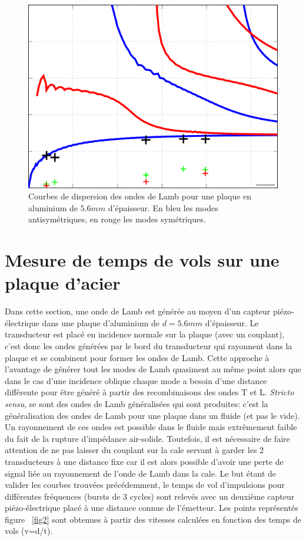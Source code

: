 \documentclass[twoside]{article}
\begin{document}
\begin{multicols}{2}
\begin{figure}[H]
\centering
\includegraphics[scale=0.55]{./images/dispercurves_aluminium.png}
\caption{\label{fig3} Courbes de dispersion des ondes de Lamb pour une plaque en aluminium de $5.6mm$ d'épaisseur. En bleu les modes antisymétriques, en rouge les modes symétriques.}
\end{figure}




\section{Mesure de temps de vols sur une plaque d'acier}
Dans cette section, une onde de Lamb est générée au moyen d'un capteur piézo-électrique dans une plaque d'aluminium de $d = 5.6mm$ d'épaisseur. Le transducteur est placé en incidence normale sur la plaque (avec un couplant), c'est donc les ondes générées par le bord du transducteur qui rayonnent dans la plaque et se combinent pour former les ondes de Lamb. Cette approche à l'avantage de générer tout les modes de Lamb quasiment au même point alors que dans le cas d'une incidence oblique chaque mode a besoin d'une distance différente pour être généré à partir des recombinaisons des ondes T et L.
\bigskip
\emph{Stricto sensu}, se sont des ondes de Lamb généralisées qui sont produites: c'est la généralisation des ondes de Lamb pour une plaque dans un fluide (et pas le vide). Un rayonnement de ces ondes est possible dans le fluide mais extrêmement faible du fait de la rupture d'impédance air-solide. Toutefois, il est nécessaire de faire attention de ne pas laisser du couplant sur la cale servant à garder les 2 transducteurs à une distance fixe car il est alors possible d'avoir une perte de signal liée au rayonnement de l'onde de Lamb dans la cale.
Le but étant de valider les courbes trouvées précédemment, le temps de vol d'impulsions pour différentes fréquences (bursts de 3 cycles) sont relevés avec un deuxième capteur piézo-électrique placé à une distance connue de l'émetteur. Les points représentés figure ~\ref{fig2} sont obtenues à partir des vitesses calculées en fonction des temps de vols (v=d/t).


\end{multicols}
\end{document}
